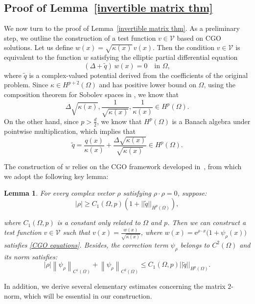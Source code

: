 \documentclass[12pt]{amsart}
\newtheorem{lem}[thm]{Lemma}
\begin{document}
\subsection{Proof of Lemma~\ref{invertible matrix thm}}\label{appendix:proof of lemma3}

We now turn to the proof of Lemma~\ref{invertible matrix thm}. As a preliminary step, we outline the construction of a test function $v \in \mathcal{V}$ based on CGO solutions. Let us define $w(x) = \sqrt{\kappa(x)}\, v(x)$. Then the condition $v \in \mathcal{V}$ is equivalent to the function $w$ satisfying the elliptic partial differential equation
\begin{equation}\label{CGO equations}
    (\Delta + \tilde{q})\, w(x) = 0 \quad \text{in } \Omega,
\end{equation}
where $\tilde{q}$ is a complex-valued potential derived from the coefficients of the original problem. Since $\kappa\in H^{p+2}(\Omega)$ and has positive lower bound on $\Omega$, using the composition theorem for Sobolev spaces in \cite{brezis_composition_2001}, we know that 
\begin{equation*}
    \Delta \sqrt{\kappa(x)},\frac{1}{\sqrt{\kappa(x)}},\frac{1}{\kappa(x)}\in H^p(\Omega). 
\end{equation*}
On the other hand, since $p>\frac{d}{2}$, we know that $H^{p}(\Omega)$ is a Banach algebra under pointwise multiplication, which implies that
\begin{equation*}
    \tilde{q}= \frac{q(x)}{\kappa(x)} + \frac{\Delta \sqrt{\kappa(x)}}{\sqrt{\kappa(x)}}\in H^{p}(\Omega).
\end{equation*}

The construction of $w$ relies on the CGO framework developed in~\cite{bal_inverse_2010}, from which we adopt the following key lemma:


\begin{lem}\label{lemma: test function construction}
For every complex vector $\rho$ satisfying $\rho \cdot \rho=0$, suppose:
\begin{equation}\label{vector condition}
    |\rho|\geq C_1(\Omega,p)(1+||\tilde{q}||_{H^p(\Omega)}),
\end{equation}

where $C_1(\Omega,p)$ is a constant only related to $\Omega$ and $p$. Then we can construct a test function $v\in \mathcal{V}$ such that $v(x)=\frac{w(x)}{\sqrt{\kappa(x)}}$, where $w(x)=\mathrm{e}^{\rho \cdot x}\Big(1+\psi_\rho(x)\Big)$ satisfies \eqref{CGO equations}. Besides, the correction term $\psi_{\rho}$ belongs to $C^{2}(\Omega)$ and its norm satisfies:
\begin{equation}
    |\rho|\left\|\psi_\rho\right\|_{C^{1}(\Omega)}+\left\|\psi_\rho\right\|_{C^{2}(\Omega)} \leqslant C_1(\Omega,p) ||\tilde{q}||_{H^p(\Omega)}.
\end{equation}
\end{lem}
In addition, we derive several elementary estimates concerning the matrix $2$-norm, which will be essential in our construction.
\end{document}
